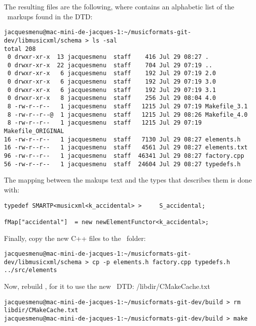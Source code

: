 The resulting files are the following, where  contains an alphabetic list of the \mxml\ markups found in the DTD:
\begin{lstlisting}[language=Terminal]
jacquesmenu@mac-mini-de-jacques-1:~/musicformats-git-dev/libmusicxml/schema > ls -sal
total 208
 0 drwxr-xr-x  13 jacquesmenu  staff    416 Jul 29 08:27 .
 0 drwxr-xr-x  22 jacquesmenu  staff    704 Jul 29 07:19 ..
 0 drwxr-xr-x   6 jacquesmenu  staff    192 Jul 29 07:19 2.0
 0 drwxr-xr-x   6 jacquesmenu  staff    192 Jul 29 07:19 3.0
 0 drwxr-xr-x   6 jacquesmenu  staff    192 Jul 29 07:19 3.1
 0 drwxr-xr-x   8 jacquesmenu  staff    256 Jul 29 08:04 4.0
 8 -rw-r--r--   1 jacquesmenu  staff   1215 Jul 29 07:19 Makefile_3.1
 8 -rw-r--r--@  1 jacquesmenu  staff   1215 Jul 29 08:26 Makefile_4.0
 8 -rw-r--r--   1 jacquesmenu  staff   1215 Jul 29 07:19 Makefile_ORIGINAL
16 -rw-r--r--   1 jacquesmenu  staff   7130 Jul 29 08:27 elements.h
16 -rw-r--r--   1 jacquesmenu  staff   4561 Jul 29 08:27 elements.txt
96 -rw-r--r--   1 jacquesmenu  staff  46341 Jul 29 08:27 factory.cpp
56 -rw-r--r--   1 jacquesmenu  staff  24604 Jul 29 08:27 typedefs.h
\end{lstlisting}

The mapping between the makups text and the types that describes them is done with:
\begin{lstlisting}[language=Terminal]
typedef SMARTP<musicxml<k_accidental> >		S_accidental;

fMap["accidental"] 	= new newElementFunctor<k_accidental>;
\end{lstlisting}

Finally, copy the new C++ files to the \elementsFolder\ folder:
\begin{lstlisting}[language=Terminal]
jacquesmenu@mac-mini-de-jacques-1:~/musicformats-git-dev/libmusicxml/schema > cp -p elements.h factory.cpp typedefs.h ../src/elements
\end{lstlisting}

Now, rebuild \mf, for it to use the new \mxml\ DTD:
/libdir/CMakeCache.txt
\begin{lstlisting}[language=Terminal]
jacquesmenu@mac-mini-de-jacques-1:~/musicformats-git-dev/build > rm libdir/CMakeCache.txt
jacquesmenu@mac-mini-de-jacques-1:~/musicformats-git-dev/build > make
\end{lstlisting}

